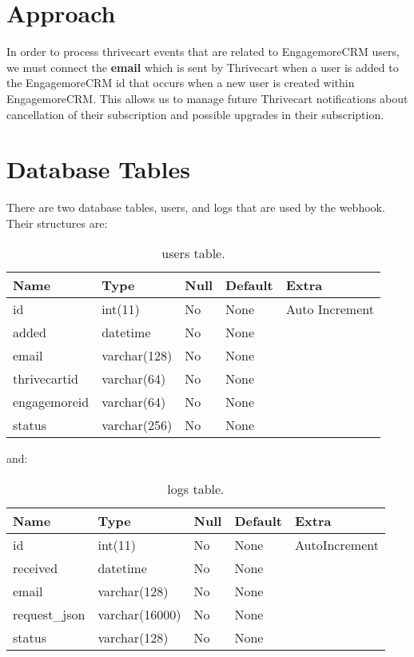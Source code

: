 \documentclass[final,letterpaper,12pt]{article}
\begin{document}
\section{Approach}
\noindent In order to process thrivecart events that are related to EngagemoreCRM users, we must connect
the {\bf email} which is sent by Thrivecart when a user is added to the EngagemoreCRM  id that
occurs when a new user is created within EngagemoreCRM.  This allows us to manage future Thrivecart
notifications about cancellation of their subscription and possible upgrades in their subscription.

\newpage
\section{Database Tables}
\noindent There are two database tables, users, and logs that are used by the webhook.  Their structures are:
\smallskip
\begin{table}[ht]
\begin{tabular}{|l|l|l|l|l|}
\hline
Name&Type&Null&Default&Extra\\ \hline
id&int(11)&No&None&Auto Increment\\
added&datetime&No&None&\\
email&varchar(128)&No&None&\\
thrivecartid&varchar(64)&No&None&\\
engagemoreid&varchar(64)&No&None&\\
status&varchar(256)&No&None&\\
\hline
\end{tabular}
\caption{\label{tab:users}users table.}
\end{table}
\newpage
\noindent and:
\begin{table}[ht]
\begin{tabular}{|l|l|l|l|l|}
\hline
Name&Type&Null&Default&Extra\\ \hline
id&int(11)&No&None&AutoIncrement\\
received&datetime&No&None&\\
email&varchar(128)&No&None&\\
request\_json&varchar(16000)&No&None&\\
status&varchar(128)&No&None&\\
\hline
\end{tabular}
\caption{\label{tab:logs}logs table.}
\end{table}
\end{document}
